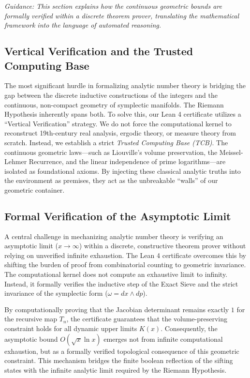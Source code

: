 \documentclass[sn-mathphys-num, pdflatex, referee]{sn-jnl}
\begin{document}
\textit{Guidance: This section explains how the continuous geometric bounds are formally verified within a discrete theorem prover, translating the mathematical framework into the language of automated reasoning.}

\subsection{Vertical Verification and the Trusted Computing Base}
The most significant hurdle in formalizing analytic number theory is bridging the gap between the discrete inductive constructions of the integers and the continuous, non-compact geometry of symplectic manifolds. The Riemann Hypothesis inherently spans both. 
To solve this, our Lean 4 certificate utilizes a ``Vertical Verification'' strategy. We do not force the computational kernel to reconstruct 19th-century real analysis, ergodic theory, or measure theory from scratch. Instead, we establish a strict \textit{Trusted Computing Base (TCB)}. The continuous geometric laws---such as Liouville's volume preservation, the Meissel-Lehmer Recurrence, and the linear independence of prime logarithms---are isolated as foundational axioms. By injecting these classical analytic truths into the environment as premises, they act as the unbreakable ``walls'' of our geometric container. 

\subsection{Formal Verification of the Asymptotic Limit}
A central challenge in mechanizing analytic number theory is verifying an asymptotic limit ($x \to \infty$) within a discrete, constructive theorem prover without relying on unverified infinite exhaustion. The Lean 4 certificate overcomes this by shifting the burden of proof from combinatorial counting to geometric invariance. 
The computational kernel does not compute an exhaustive limit to infinity. Instead, it formally verifies the inductive step of the Exact Sieve and the strict invariance of the symplectic form ($\omega = dx \wedge dp$). 

By computationally proving that the Jacobian determinant remains exactly $1$ for the recursive map $T_n$, the certificate guarantees that the volume-preserving constraint holds for all dynamic upper limits $K(x)$. Consequently, the asymptotic bound $O(\sqrt{x}\ln x)$ emerges not from infinite computational exhaustion, but as a formally verified topological consequence of this geometric constraint. This mechanism bridges the finite boolean reflection of the sifting states with the infinite analytic limit required by the Riemann Hypothesis.
\end{document}
